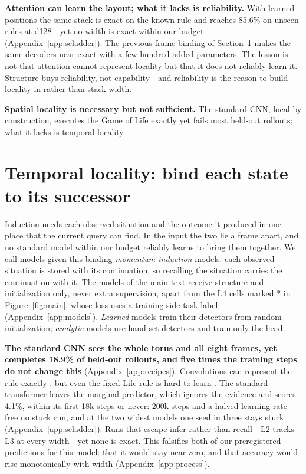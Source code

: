 \documentclass[11pt]{article}
\begin{document}
\textbf{Attention can learn the layout; what it lacks is reliability.} With learned positions the same stack is exact on the known rule and reaches 85.6\% on unseen rules at d128---yet no width is exact within our budget (Appendix~\ref{app:scladder}). The previous-frame binding of Section~\ref{sec:temporal} makes the same decoders near-exact with a few hundred added parameters. The lesson is not that attention cannot represent locality but that it does not reliably learn it. Structure buys reliability, not capability---and reliability is the reason to build locality in rather than stack width.

\textbf{Spatial locality is necessary but not sufficient.} The standard CNN, local by construction, executes the Game of Life exactly yet fails most held-out rollouts; what it lacks is temporal locality.

\section{Temporal locality: bind each state to its successor}
\label{sec:temporal}

Induction needs each observed situation and the outcome it produced in one place that the current query can find. In the input the two lie a frame apart, and no standard model within our budget reliably learns to bring them together. We call models given this binding \emph{momentum induction} models: each observed situation is stored with its continuation, so recalling the situation carries the continuation with it. The models of the main text receive structure and initialization only, never extra supervision, apart from the L4 cells marked * in Figure~\ref{fig:main}, whose loss uses a training-side task label (Appendix~\ref{app:models}). \emph{Learned} models train their detectors from random initialization; \emph{analytic} models use hand-set detectors and train only the head.

\textbf{The standard CNN sees the whole torus and all eight frames, yet completes 18.9\% of held-out rollouts, and five times the training steps do not change this} (Appendix~\ref{app:recipes}). Convolutions can represent the rule exactly \citep{gilpin2019cellular}, but even the fixed Life rule is hard to learn \citep{springer2021hard}. The standard transformer leaves the marginal predictor, which ignores the evidence and scores 4.1\%, within its first 18k steps or never: 200k steps and a halved learning rate free no stuck run, and at the two widest models one seed in three stays stuck (Appendix~\ref{app:scladder}). Runs that escape infer rather than recall---L2 tracks L3 at every width---yet none is exact. This falsifies both of our preregistered predictions for this model: that it would stay near zero, and that accuracy would rise monotonically with width (Appendix~\ref{app:process}).
\end{document}

